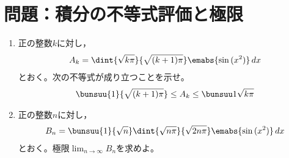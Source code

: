 \documentclass[../../../doc/main]{subfiles}
\begin{document}
    \setcounter{chapter}{1}
    \setcounter{section}{1}
    \section{問題：積分の不等式評価と極限}\label{問題1}
        \begin{tcolorbox}
            \begin{enumerate}
            \item [\kakkoichi] 正の整数$k$に対し，
                \begin{align*}
                    A_k=\dint{\sqrt{k\pi}}{\sqrt{(k+1)\pi}}\emabs{\sin{(x^2)}}\,dx
                \end{align*}
                とおく。次の不等式が成り立つことを示せ。
                \begin{align*}
                    \bunsuu{1}{\sqrt{(k+1)\pi}}\leq A_k\leq \bunsuu1{\sqrt{k\pi}}
                \end{align*}
            \item [\kakkoni] 正の整数$n$に対し，
                \begin{align*}
                    B_n=\bunsuu{1}{\sqrt{n}}\dint{\sqrt{n\pi}}{\sqrt{2n\pi}}\emabs{\sin{(x^2)}}\,dx
                \end{align*}
                とおく。極限$\displaystyle\lim_{n\to\infty}B_n$を求めよ。
            \end{enumerate}
        \end{tcolorbox}
\end{document}

